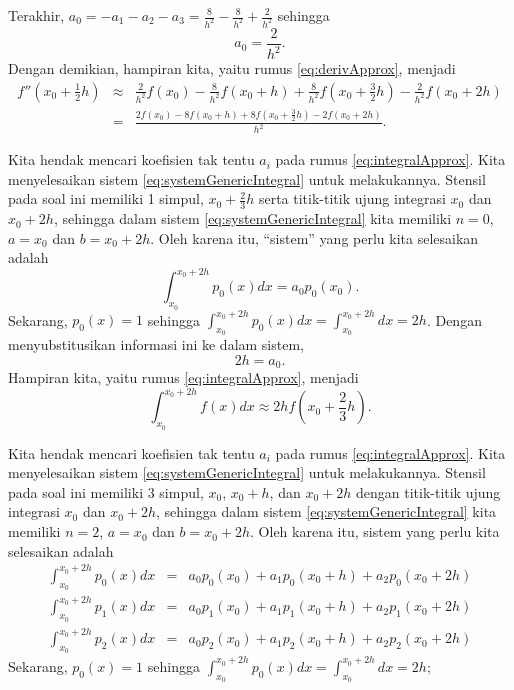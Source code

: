 \begin{description}
\[\]
Terakhir, $a_{0}=-a_{1}-a_{2}-a_{3}=\frac{8}{h^{2}}-\frac{8}{h^{2}}+\frac{2}{h^{2}}$
sehingga
\[
a_{0}=\frac{2}{h^{2}}.
\]
Dengan demikian, hampiran kita, yaitu rumus \ref{eq:derivApprox},
menjadi
\begin{eqnarray*}
f''\left(x_{0}+\frac{1}{2}h\right) & \approx & \frac{2}{h^{2}}f(x_{0})-\frac{8}{h^{2}}f(x_{0}+h)+\frac{8}{h^{2}}f(x_{0}+\frac{3}{2}h)-\frac{2}{h^{2}}f(x_{0}+2h)\\
 & = & \frac{2f(x_{0})-8f(x_{0}+h)+8f(x_{0}+\frac{3}{2}h)-2f(x_{0}+2h)}{h^{2}}.
\end{eqnarray*}
\item [{\ref{exc:undetermined-2}b:}] Kita hendak mencari koefisien tak
tentu $a_{i}$ pada rumus \ref{eq:integralApprox}. Kita menyelesaikan
sistem \ref{eq:systemGenericIntegral} untuk melakukannya. Stensil
pada soal ini memiliki 1 simpul, $x_{0}+\frac{2}{3}h$ serta titik-titik
ujung integrasi $x_{0}$ dan $x_{0}+2h$, sehingga dalam sistem \ref{eq:systemGenericIntegral}
kita memiliki $n=0$, $a=x_{0}$ dan $b=x_{0}+2h$. Oleh karena itu,
``sistem'' yang perlu kita selesaikan adalah 
\[
\int_{x_{0}}^{x_{0}+2h}p_{0}(x)dx=a_{0}p_{0}(x_{0}).
\]
Sekarang, $p_{0}(x)=1$ sehingga $\int_{x_{0}}^{x_{0}+2h}p_{0}(x)dx=\int_{x_{0}}^{x_{0}+2h}dx=2h$.
Dengan menyubstitusikan informasi ini ke dalam sistem,
\[
2h=a_{0}.
\]
Hampiran kita, yaitu rumus \ref{eq:integralApprox}, menjadi
\[
\int_{x_{0}}^{x_{0}+2h}f(x)dx\approx2hf\left(x_{0}+\frac{2}{3}h\right).
\]
\item [{\ref{exc:undetermined-2}l:}] Kita hendak mencari koefisien tak
tentu $a_{i}$ pada rumus \ref{eq:integralApprox}. Kita menyelesaikan
sistem \ref{eq:systemGenericIntegral} untuk melakukannya. Stensil
pada soal ini memiliki 3 simpul, $x_{0}$, $x_{0}+h$, dan $x_{0}+2h$
dengan titik-titik ujung integrasi $x_{0}$ dan $x_{0}+2h$, sehingga
dalam sistem \ref{eq:systemGenericIntegral} kita memiliki $n=2$,
$a=x_{0}$ dan $b=x_{0}+2h$. Oleh karena itu, sistem yang perlu kita
selesaikan adalah 
\begin{eqnarray*}
\int_{x_{0}}^{x_{0}+2h}p_{0}(x)dx & = & a_{0}p_{0}(x_{0})+a_{1}p_{0}(x_{0}+h)+a_{2}p_{0}(x_{0}+2h)\\
\int_{x_{0}}^{x_{0}+2h}p_{1}(x)dx & = & a_{0}p_{1}(x_{0})+a_{1}p_{1}(x_{0}+h)+a_{2}p_{1}(x_{0}+2h)\\
\int_{x_{0}}^{x_{0}+2h}p_{2}(x)dx & = & a_{0}p_{2}(x_{0})+a_{1}p_{2}(x_{0}+h)+a_{2}p_{2}(x_{0}+2h)
\end{eqnarray*}
Sekarang, $p_{0}(x)=1$ sehingga $\int_{x_{0}}^{x_{0}+2h}p_{0}(x)dx=\int_{x_{0}}^{x_{0}+2h}dx=2h$;

\end{description}
